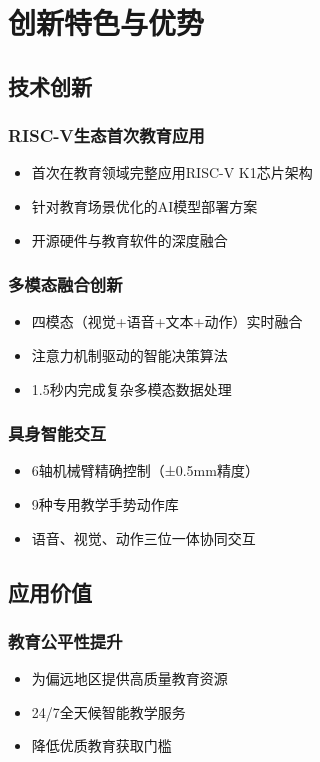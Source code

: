 \documentclass[12pt,a4paper]{article}
\begin{document}
\newpage

\section{创新特色与优势}

\subsection{技术创新}

\subsubsection{RISC-V生态首次教育应用}
\begin{itemize}[leftmargin=2em]
    \item 首次在教育领域完整应用RISC-V K1芯片架构
    \item 针对教育场景优化的AI模型部署方案
    \item 开源硬件与教育软件的深度融合
\end{itemize}

\subsubsection{多模态融合创新}
\begin{itemize}[leftmargin=2em]
    \item 四模态（视觉+语音+文本+动作）实时融合
    \item 注意力机制驱动的智能决策算法
    \item 1.5秒内完成复杂多模态数据处理
\end{itemize}

\subsubsection{具身智能交互}
\begin{itemize}[leftmargin=2em]
    \item 6轴机械臂精确控制（±0.5mm精度）
    \item 9种专用教学手势动作库
    \item 语音、视觉、动作三位一体协同交互
\end{itemize}

\subsection{应用价值}

\subsubsection{教育公平性提升}
\begin{itemize}[leftmargin=2em]
    \item 为偏远地区提供高质量教育资源
    \item 24/7全天候智能教学服务
    \item 降低优质教育获取门槛
\end{itemize}
\end{document}
